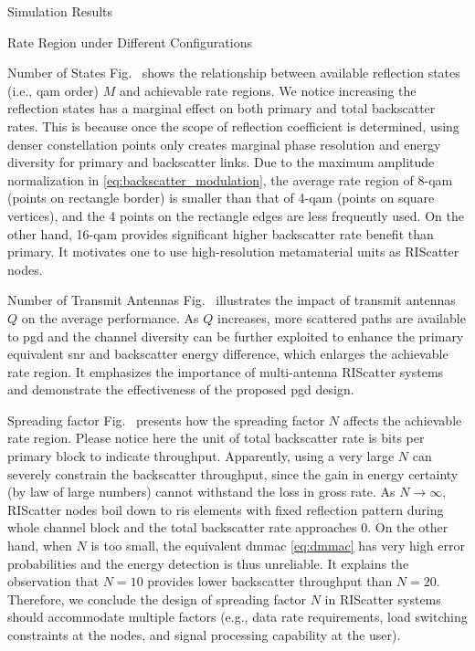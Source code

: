 \documentclass[journal]{IEEEtran}
\begin{document}
\begin{section}{Simulation Results}
\begin{subsection}{Rate Region under Different Configurations}
		\begin{subsubsection}{Number of States}
			Fig.~ shows the relationship between available reflection states (i.e., \gls{qam} order) $M$ and achievable rate regions.
			We notice increasing the reflection states has a marginal effect on both primary and total backscatter rates.
			This is because once the scope of reflection coefficient is determined, using denser constellation points only creates marginal phase resolution and energy diversity for primary and backscatter links.
			Due to the maximum amplitude normalization in \eqref{eq:backscatter_modulation}, the average rate region of \num{8}-\gls{qam} (points on rectangle border) is smaller than that of \num{4}-\gls{qam} (points on square vertices), and the \num{4} points on the rectangle edges are less frequently used.
			On the other hand, \num{16}-\gls{qam} provides significant higher backscatter rate benefit than primary.
			It motivates one to use high-resolution metamaterial units as RIScatter nodes.
		\end{subsubsection}

		\begin{subsubsection}{Number of Transmit Antennas}
			Fig.~ illustrates the impact of transmit antennas $Q$ on the average performance.
			As $Q$ increases, more scattered paths are available to \gls{pgd} and the channel diversity can be further exploited to enhance the primary equivalent \gls{snr} and backscatter energy difference, which enlarges the achievable rate region.
			It emphasizes the importance of multi-antenna RIScatter systems and demonstrate the effectiveness of the proposed \gls{pgd} design.
		\end{subsubsection}

		\begin{subsubsection}{Spreading factor}
			Fig.~ presents how the spreading factor $N$ affects the achievable rate region.
			Please notice here the unit of total backscatter rate is bits per primary block to indicate throughput.
			Apparently, using a very large $N$ can severely constrain the backscatter throughput, since the gain in energy certainty (by law of large numbers) cannot withstand the loss in gross rate.
			As $N \to \infty$, RIScatter nodes boil down to \gls{ris} elements with fixed reflection pattern during whole channel block and the total backscatter rate approaches \num{0}.
			On the other hand, when $N$ is too small, the equivalent \gls{dmmac} \eqref{eq:dmmac} has very high error probabilities and the energy detection is thus unreliable.
			It explains the observation that $N=10$ provides lower backscatter throughput than $N=20$.
			Therefore, we conclude the design of spreading factor $N$ in RIScatter systems should accommodate multiple factors (e.g., data rate requirements, load switching constraints at the nodes, and signal processing capability at the user).
		\end{subsubsection}


\end{subsection}
\end{section}
\end{document}
